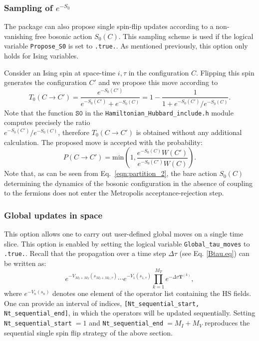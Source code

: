 \subsubsection{Sampling of $e^{-S_0}$}
\label{sec:S0}
% 
The package can also propose single spin-flip updates according to a non-vanishing free bosonic action $S_0(C)$. This sampling scheme is used if the logical variable \texttt{Propose\_S0} is set to \texttt{.true.}.   As mentioned previously, this option only holds for Ising variables. 

Consider an Ising spin at space-time $i,\tau$ in the configuration $C$. Flipping this spin generates the configuration $C'$ and we propose this move according to 
\begin{equation}
T_0(C \rightarrow C')  =  \frac{e^{-S_0(C')}}{ e^{-S_0(C')} + e^{-S_0(C)} }   = 1 - \frac{1}{1 +  e^{-S_0(C')} /e^{-S_0(C)}}.
\end{equation}
Note that the function $\texttt{S0}$ in the  \texttt{Hamiltonian\_Hubbard\_include.h}  module  computes precisely the ratio\\
 ${e^{-S_0(C')} /e^{-S_0(C)}}$, therefore $T_0(C \rightarrow C') $ is obtained without any additional calculation. 
The proposed move is accepted with the probability: 
\begin{equation}
 P(C \rightarrow C') =  \text{min}  \left( 1,  \frac{e^{-S_0(C)}   W(C')}{ e^{-S_0(C')} W(C)} \right).
\end{equation}
Note that, as can be seen from Eq.~\eqref{eqn:partition_2}, the bare action $S_0(C)$  determining the  dynamics of the bosonic configuration in the absence of coupling to the fermions does not enter the Metropolis acceptance-rejection step.
% 
% 

\subsubsection{Global updates in space} 
\label{sec:global_space}
This option allows one to carry out  user-defined global moves on a single time slice.  This option is enabled by setting the logical variable  \texttt{Global\_tau\_moves} to \texttt{.true.}.  Recall that the propagation over a time step $\Delta \tau$   (see Eq. \ref{Btau.eq}) can be  written as: 
\begin{equation}
	e^{-V_{M_I+M_V}(s_{M_I+M_V,\tau})}  \cdots e^{-V_{1}(s_{1,\tau})}  \prod_{k=1}^{M_T}   e^{-\Delta \tau {\bm T}^{(k)}},
\end{equation}
where $e^{-V_{n}(s_{n})}$ denotes one element of the  operator list  containing the HS fields.  One can provide  an interval of indices, 
\texttt{[Nt\_sequential\_start, Nt\_sequential\_end]},  in which the operators will be updated  sequentially. Setting \texttt{Nt\_sequential\_start}$\; = 1$ and \texttt{Nt\_sequential\_end}$\; = M_I+M_V$  reproduces the  sequential single spin flip strategy of the above section.

